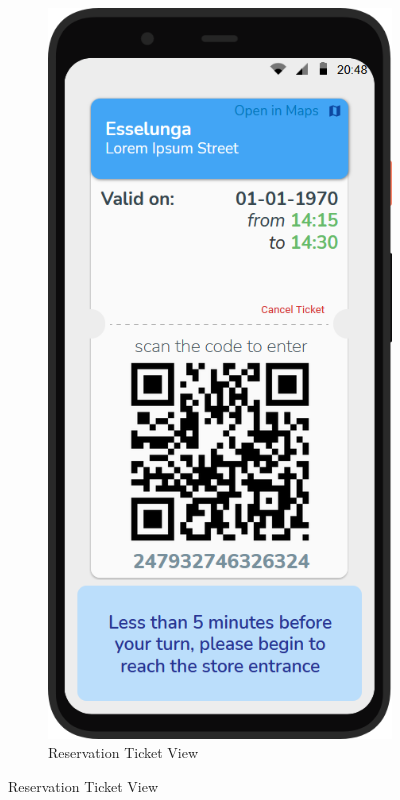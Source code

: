 \begin{figure}[H]
    \begin{subfigure}{.33\textwidth}
        \centering
        \includegraphics[width=.95\linewidth]{Images/screen_08.png}
        \caption{Reservation Ticket View}

\end{subfigure}
\end{figure}
